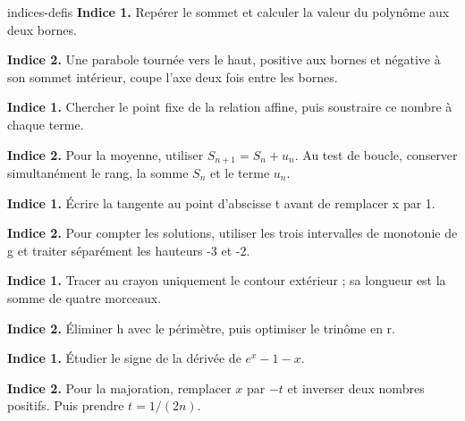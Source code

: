 \begin{blocEdition}{indices-defis}
\textbf{Indice 1.} Repérer le sommet et calculer la valeur du polynôme aux deux bornes.\par\smallskip
\textbf{Indice 2.} Une parabole tournée vers le haut, positive aux bornes et négative à son sommet intérieur, coupe l'axe deux fois entre les bornes.\par\smallskip
{}
\textbf{Indice 1.} Chercher le point fixe de la relation affine, puis soustraire ce nombre à chaque terme.\par\smallskip
\textbf{Indice 2.} Pour la moyenne, utiliser $S_{n+1}=S_n+u_n$. Au test de boucle, conserver simultanément le rang, la somme $S_n$ et le terme $u_n$.\par\smallskip
{}
\textbf{Indice 1.} Écrire la tangente au point d'abscisse t avant de remplacer x par 1.\par\smallskip
\textbf{Indice 2.} Pour compter les solutions, utiliser les trois intervalles de monotonie de g et traiter séparément les hauteurs -3 et -2.\par\smallskip
{}
\textbf{Indice 1.} Tracer au crayon uniquement le contour extérieur ; sa longueur est la somme de quatre morceaux.\par\smallskip
\textbf{Indice 2.} Éliminer h avec le périmètre, puis optimiser le trinôme en r.\par\smallskip
{}
\textbf{Indice 1.} Étudier le signe de la dérivée de $e^x-1-x$.\par\smallskip
\textbf{Indice 2.} Pour la majoration, remplacer $x$ par $-t$ et inverser deux nombres positifs. Puis prendre $t=1/(2n)$.\par\smallskip
\end{blocEdition}

